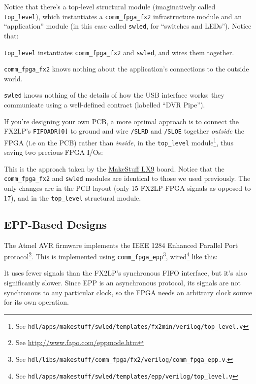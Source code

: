 
Notice that there's a top-level structural module (imaginatively called \texttt{top\_level}), which instantiates a \texttt{comm\_fpga\_fx2} infrastructure module and an ``application'' module (in this case called \texttt{swled}, for ``switches and LEDs''). Notice that:
\begin{blobs}
  \item \texttt{top\_level} instantiates \texttt{comm\_fpga\_fx2} and \texttt{swled}, and wires them together.
  \item \texttt{comm\_fpga\_fx2} knows nothing about the application's connections to the outside world.
  \item \texttt{swled} knows nothing of the details of how the USB interface works: they communicate using a well-defined contract (labelled ``DVR Pipe'').
\end{blobs}

If you're designing your own PCB, a more optimal approach is to connect the FX2LP's \texttt{FIFOADR[0]} to ground and wire \texttt{/SLRD} and \texttt{/SLOE} together \textit{outside} the FPGA (i.e on the PCB) rather than \textit{inside}, in the \texttt{top\_level} module\footnote{See \texttt{hdl/apps/makestuff/swled/templates/fx2min/verilog/top\_level.v}}, thus saving two precious FPGA I/Os:


This is the approach taken by the \href{http://www.makestuff.eu/wordpress/electronics/lx9-fpga-board}{MakeStuff LX9} board. Notice that the \texttt{comm\_fpga\_fx2} and \texttt{swled} modules are identical to those we used previously. The only changes are in the PCB layout (only 15 FX2LP-FPGA signals as opposed to 17), and in the \texttt{top\_level} structural module.

\subsection{EPP-Based Designs}
The Atmel AVR firmware implements the IEEE 1284 Enhanced Parallel Port
protocol\footnote{See \url{http://www.fapo.com/eppmode.htm}}. This is implemented using \texttt{comm\_fpga\_epp}\footnote{See \texttt{hdl/libs/makestuff/comm\_fpga/fx2/verilog/comm\_fpga\_epp.v}.}, wired\footnote{See \texttt{hdl/apps/makestuff/swled/templates/epp/verilog/top\_level.v}} like this:


It uses fewer signals than the FX2LP's synchronous FIFO interface, but it's also significantly slower. Since EPP is an asynchronous protocol, its signals are not synchronous to any particular clock, so the FPGA needs an arbitrary clock source for its own operation.

